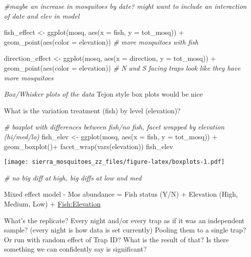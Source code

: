 \documentclass[
]{article}
\newenvironment{Shaded}{\begin{snugshade}}{\end{snugshade}}
\newcommand{\AttributeTok}[1]{\textcolor[rgb]{0.77,0.63,0.00}{#1}}
\newcommand{\CommentTok}[1]{\textcolor[rgb]{0.56,0.35,0.01}{\textit{#1}}}
\newcommand{\FunctionTok}[1]{\textcolor[rgb]{0.00,0.00,0.00}{#1}}
\newcommand{\NormalTok}[1]{#1}
\newcommand{\OtherTok}[1]{\textcolor[rgb]{0.56,0.35,0.01}{#1}}
\newcommand{\SpecialCharTok}[1]{\textcolor[rgb]{0.00,0.00,0.00}{#1}}
\begin{document}
\begin{Shaded}
\begin{Highlighting}[]
\CommentTok{\#maybe an increase in mosquitoes by date? might want to include an interaction of date and elev in model}

\NormalTok{fish\_effect }\OtherTok{\textless{}{-}} \FunctionTok{ggplot}\NormalTok{(mosq, }\FunctionTok{aes}\NormalTok{(}\AttributeTok{x =}\NormalTok{ fish, }\AttributeTok{y =}\NormalTok{ tot\_mosq)) }\SpecialCharTok{+}
  \FunctionTok{geom\_point}\NormalTok{(}\FunctionTok{aes}\NormalTok{(}\AttributeTok{color =}\NormalTok{ elevation))}
\CommentTok{\# more mosquitoes with fish}

\NormalTok{direction\_effect }\OtherTok{\textless{}{-}} \FunctionTok{ggplot}\NormalTok{(mosq, }\FunctionTok{aes}\NormalTok{(}\AttributeTok{x =}\NormalTok{ direction, }\AttributeTok{y =}\NormalTok{ tot\_mosq)) }\SpecialCharTok{+}
  \FunctionTok{geom\_point}\NormalTok{(}\FunctionTok{aes}\NormalTok{(}\AttributeTok{color =}\NormalTok{ elevation))}
\CommentTok{\# N and S facing traps look like they have more mosquitoes}
\end{Highlighting}
\end{Shaded}

\emph{Box/Whisker plots of the data} Tejon style box plots would be nice

What is the variation treatment (fish) by level (elevation)?

\begin{Shaded}
\begin{Highlighting}[]
\CommentTok{\# boxplot with differences between fish/no fish, facet wrapped by elevation (hi/med/lo)}
\NormalTok{fish\_elev }\OtherTok{\textless{}{-}} \FunctionTok{ggplot}\NormalTok{(mosq, }\FunctionTok{aes}\NormalTok{(}\AttributeTok{x =}\NormalTok{ fish, }\AttributeTok{y =}\NormalTok{ tot\_mosq)) }\SpecialCharTok{+}
  \FunctionTok{geom\_boxplot}\NormalTok{()}\SpecialCharTok{+}
  \FunctionTok{facet\_wrap}\NormalTok{(}\FunctionTok{vars}\NormalTok{(elevation))}
\NormalTok{fish\_elev}
\end{Highlighting}
\end{Shaded}

\texttt{[image: sierra\_mosquitoes\_zz\_files/figure-latex/boxplots-1.pdf]}

\begin{Shaded}
\begin{Highlighting}[]
\CommentTok{\# no big diff at high, big diffs at low and med}
\end{Highlighting}
\end{Shaded}

Mixed effect model - Mos abundance = Fish status (Y/N) + Elevation
(High, Medium, Low) + \url{Fish:Elevation}

What's the replicate? Every night and/or every trap as if it was an
independent sample? (every night is how data is set currently) Pooling
them to a single trap? Or run with random effect of Trap ID? What is the
result of that? Is there something we can confidently say is
significant?
\end{document}
